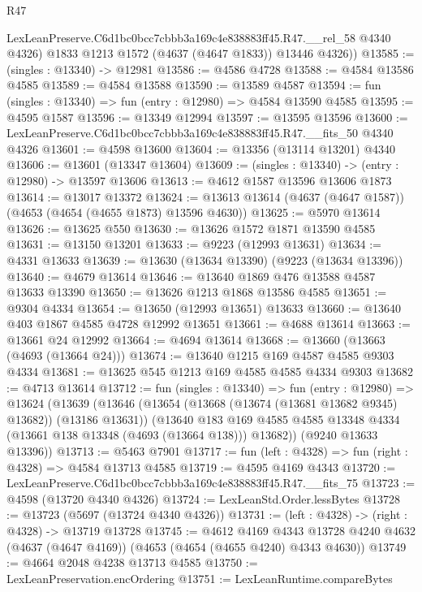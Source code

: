 \begin{lexlean}{R47}
\begin{coremodule}
        LexLeanPreserve.C6d1bc0bcc7cbbb3a169c4e838883ff45.R47.__rel_58 @4340 @4326)
        @1833
        @1213
        @1572
        (@4637 (@4647 @1833))
        @13446
        @4326))
@13585 := (singles : @13340) -> @12981
@13586 := @4586 @4728
@13588 := @4584 @13586 @4585
@13589 := @4584 @13588
@13590 := @13589 @4587
@13594 := fun (singles : @13340) => fun (entry : @12980) => @4584 @13590 @4585
@13595 := @4595 @1587
@13596 := @13349 @12994
@13597 := @13595 @13596
@13600 := LexLeanPreserve.C6d1bc0bcc7cbbb3a169c4e838883ff45.R47.__fits_50 @4340 @4326
@13601 := @4598 @13600
@13604 := @13356 (@13114 @13201) @4340
@13606 := @13601 (@13347 @13604)
@13609 := (singles : @13340) -> (entry : @12980) -> @13597 @13606
@13613 := @4612 @1587 @13596 @13606 @1873
@13614 := @13017 @13372
@13624 := @13613 @13614 (@4637 (@4647 @1587)) (@4653 (@4654 (@4655 @1873) @13596 @4630))
@13625 := @5970 @13614
@13626 := @13625 @550
@13630 := @13626 @1572 @1871 @13590 @4585
@13631 := @13150 @13201
@13633 := @9223 (@12993 @13631)
@13634 := @4331 @13633
@13639 := @13630 (@13634 @13390) (@9223 (@13634 @13396))
@13640 := @4679 @13614
@13646 := @13640 @1869 @476 @13588 @4587 @13633 @13390
@13650 := @13626 @1213 @1868 @13586 @4585
@13651 := @9304 @4334
@13654 := @13650 (@12993 @13651) @13633
@13660 := @13640 @403 @1867 @4585 @4728 @12992 @13651
@13661 := @4688 @13614
@13663 := @13661 @24 @12992
@13664 := @4694 @13614
@13668 := @13660 (@13663 (@4693 (@13664 @24)))
@13674 := @13640 @1215 @169 @4587 @4585 @9303 @4334
@13681 := @13625 @545 @1213 @169 @4585 @4585 @4334 @9303
@13682 := @4713 @13614
@13712 := fun (singles : @13340) =>
  fun (entry : @12980) =>
  @13624
    (@13639
      (@13646
        (@13654 (@13668 (@13674 (@13681 @13682 @9345) @13682)) (@13186 @13631))
        (@13640
          @183
          @169
          @4585
          @4585
          @13348
          @4334
          (@13661 @138 @13348 (@4693 (@13664 @138)))
          @13682))
      (@9240 @13633 @13396))
@13713 := @5463 @7901
@13717 := fun (left : @4328) => fun (right : @4328) => @4584 @13713 @4585
@13719 := @4595 @4169 @4343
@13720 := LexLeanPreserve.C6d1bc0bcc7cbbb3a169c4e838883ff45.R47.__fits_75
@13723 := @4598 (@13720 @4340 @4326)
@13724 := LexLeanStd.Order.lessBytes
@13728 := @13723 (@5697 (@13724 @4340 @4326))
@13731 := (left : @4328) -> (right : @4328) -> @13719 @13728
@13745 := @4612
    @4169
    @4343
    @13728
    @4240
    @4632
    (@4637 (@4647 @4169))
    (@4653 (@4654 (@4655 @4240) @4343 @4630))
@13749 := @4664 @2048 @4238 @13713 @4585
@13750 := LexLeanPreservation.encOrdering
@13751 := LexLeanRuntime.compareBytes

\end{coremodule}
\end{lexlean}

